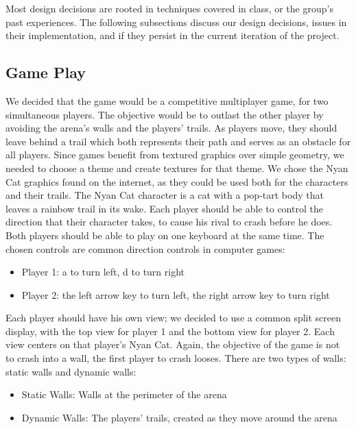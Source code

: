 \documentclass[12pt]{article}
\begin{document}
Most design decisions are rooted in techniques covered in class, or the group's past experiences.  The following subsections discuss our design decisions, issues in their implementation, and if they persist in the current iteration of the project.

\subsection{Game Play}

We decided that the game would be a competitive multiplayer game, for two simultaneous players.  The objective would be to outlast the other player by avoiding the arena's walls and the players' trails.  As players move, they should leave behind a trail which both represents their path and serves as an obstacle for all players.  Since games benefit from textured graphics over simple geometry, we needed to choose a theme and create textures for that theme.  We chose the Nyan Cat graphics found on the internet, as they could be used both for the characters and their trails.  The Nyan Cat character is a cat with a pop-tart body that leaves a rainbow trail in its wake.  Each player should be able to control the direction that their character takes, to cause his rival to crash before he does.  Both players should be able to play on one keyboard at the same time.  The chosen controls are common direction controls in computer games:

\begin{itemize}
\item Player 1: a to turn left, d to turn right
\item Player 2: the left arrow key to turn left, the right arrow key to turn right
\end{itemize}

Each player should have his own view; we decided to use a common split screen display, with the top view for player 1 and the bottom view for player 2.  Each view centers on that player's Nyan Cat.
Again, the objective of the game is not to crash into a wall, the first player to crash looses.  There are two types of walls: static walls and dynamic walls:

\begin{itemize}
\item Static Walls: Walls at the perimeter of the arena
\item Dynamic Walls: The players' trails, created as they move around the arena
\end{itemize}
\end{document}
